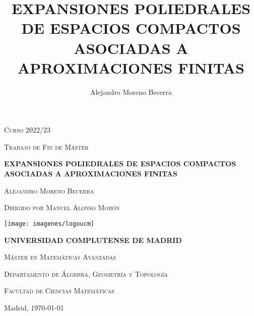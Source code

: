\documentclass[twoside,reqno, 12pt]{amsbook}
\author{Alejandro Moreno Becerra}
\title{EXPANSIONES POLIEDRALES DE ESPACIOS COMPACTOS ASOCIADAS A APROXIMACIONES FINITAS}
\theoremstyle{definition}
\theoremstyle{definition}
\theoremstyle{definition}
\theoremstyle{definition}
\theoremstyle{definition}
\theoremstyle{definition}
\theoremstyle{definition}
\numberwithin{figure}{chapter}
\begin{document}
\begin{titlepage}

\begin{center}
\textsc{Curso 2022/23}

\vspace*{0.25cm}

\textsc{Trabajo de Fin de Máster}


\vspace*{0.5cm}

{\large \textbf{EXPANSIONES POLIEDRALES DE ESPACIOS COMPACTOS ASOCIADAS A APROXIMACIONES FINITAS}}

\vspace*{0.5cm}

\textsc{Alejandro Moreno Becerra}

\vspace*{0.25cm}

\textsc{Dirigido por Manuel Alonso Morón}


\vspace*{0.8cm}

\texttt{[image: imagenes/logoucm]}

\vspace*{0.8cm}
{\large \textbf{UNIVERSIDAD COMPLUTENSE DE MADRID}}

\vspace*{0.8cm}
\textsc{Máster en Matemáticas Avanzadas}


\vspace*{0.8cm}
\textsc{Departamento de Álgebra, Geometría y Topología}

\vspace*{0.25cm}
\textsc{Facultad de Ciencias Matemáticas}


\vspace*{6cm}

Madrid, \today

\thispagestyle{empty}

\end{center}
\end{titlepage}
\end{document}

